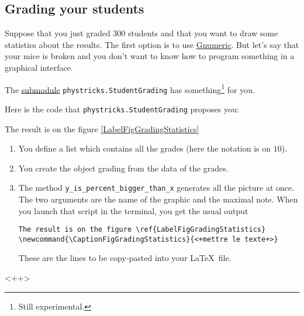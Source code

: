 \subsection{Grading your students}

Suppose that you just graded $300$ students and that you want to draw some statistics about the results. The first option is to use \href{http://projects.gnome.org/gnumeric/}{Gnumeric}. But let's say that your mice is broken and you don't want to know how to program something in a graphical interface.

The \href{http://en.wikipedia.org/wiki/Submodule}{submodule} \verb+phystricks.StudentGrading+ has something\footnote{Still experimental.} for you.

Here is the code that \verb+phystricks.StudentGrading+ proposes you:


The result is on the figure \ref{LabelFigGradingStatistics}
\newcommand{\CaptionFigGradingStatistics}{$y$ is the percentage of students that has more or equal to $x$. This graphics shows you that about half of your students have more than $4/10$ and that slightly more than $20$ per cent of your students have more than $6$.}


\begin{enumerate}

	\item
		You define a list which contains all the grades (here the notation is on $10$).
	\item
		You create the object grading from the data of the grades.
	\item
		The method \verb+y_is_percent_bigger_than_x+ generates all the picture at once. The two arguments are the name of the graphic and the maximal note. When you launch that script in the terminal, you get the usual output
		\begin{verbatim}
The result is on the figure \ref{LabelFigGradingStatistics}
\newcommand{\CaptionFigGradingStatistics}{<+mettre le texte+>}

		\end{verbatim}
		These are the lines to be copy-pasted into your \LaTeX\ file.

\end{enumerate}
<++>


